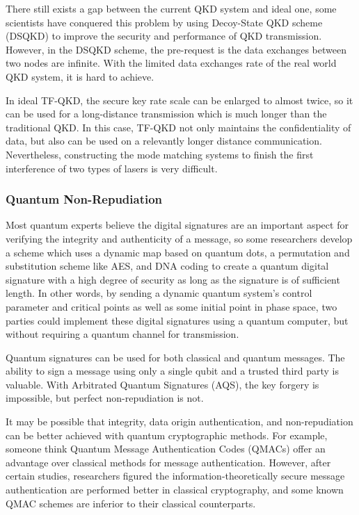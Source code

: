 \documentclass[sigconf]{acmart}
\begin{document}
There still exists a gap between the current QKD system and ideal one, some scientists have conquered this problem by using Decoy-State QKD scheme (DSQKD) to improve the security and performance of QKD transmission. However, in the DSQKD scheme, the pre-request is the data exchanges between two nodes are infinite. With the limited data exchanges rate of the real world QKD system, it is hard to achieve\cite{yu_study_2020}.

In ideal TF-QKD, the secure key rate scale can be enlarged to almost twice, so it can be used for a long-distance transmission which is much longer than the traditional QKD. In this case, TF-QKD not only maintains the confidentiality of data, but also can be used on a relevantly longer distance communication. Nevertheless, constructing the mode matching systems to finish the first interference of two types of lasers is very difficult\cite{park_research_2020}.


\subsubsection{Quantum Non-Repudiation}
Most quantum experts believe the digital signatures are an important aspect for verifying the integrity and authenticity of a message, so some researchers develop a scheme which uses a dynamic map based on quantum dots, a permutation and substitution scheme like AES, and DNA coding to create a quantum digital signature with a high degree of security as long as the signature is of sufficient length. In other words, by sending a dynamic quantum system's control parameter and critical points as well as some initial point in phase space, two parties could implement these digital signatures using a quantum computer, but without requiring a quantum channel for transmission\cite{hematpour_presence_2020}.

Quantum signatures can be used for both classical and quantum messages. The ability to sign a message using only a single qubit and a trusted third party is valuable. With Arbitrated Quantum Signatures (AQS), the key forgery is impossible, but perfect non-repudiation is not\cite{kang_quantum_2015}.

It may be possible that integrity, data origin authentication, and non-repudiation can be better achieved with quantum cryptographic methods. For example, someone think Quantum Message Authentication Codes (QMACs) offer an advantage over classical methods for message authentication. However, after certain studies, researchers figured the information-theoretically secure message authentication are performed better in classical cryptography, and some known QMAC schemes are inferior to their classical counterparts\cite{nikolopoulos_information-theoretically_2020}.
\end{document}
